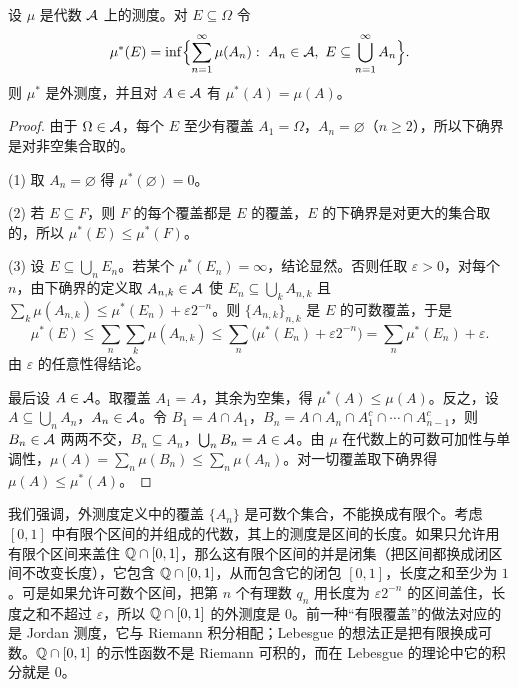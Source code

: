 \begin{proposition}[由代数上的测度诱导的外测度]\label{prop:extension:induced-outer}
设 $\mu$ 是代数 $\mathcal{A}$ 上的测度。对 $E\subseteq\Omega$ 令
\[
\mu^*(E)=\inf\Bigl\{\sum_{n=1}^\infty\mu(A_n):\ A_n\in\cA,\ E\subseteq\bigcup_{n=1}^\infty A_n\Bigr\}.
\]
则 $\mu^*$ 是外测度，并且对 $A\in\mathcal{A}$ 有 $\mu^*(A)=\mu(A)$。
\end{proposition}
\begin{proof}
由于 $\Omega\in\mathcal{A}$，每个 $E$ 至少有覆盖 $A_1=\Omega$，$A_n=\varnothing$（$n\geqslant2$），所以下确界是对非空集合取的。

(1) 取 $A_n=\varnothing$ 得 $\mu^*(\varnothing)=0$。

(2) 若 $E\subseteq F$，则 $F$ 的每个覆盖都是 $E$ 的覆盖，$E$ 的下确界是对更大的集合取的，所以 $\mu^*(E)\leqslant\mu^*(F)$。

(3) 设 $E\subseteq\bigcup_nE_n$。若某个 $\mu^*(E_n)=\infty$，结论显然。否则任取 $\varepsilon>0$，对每个 $n$，由下确界的定义取 $A_{n,k}\in\mathcal{A}$ 使 $E_n\subseteq\bigcup_kA_{n,k}$ 且 $\sum_k\mu(A_{n,k})\leqslant\mu^*(E_n)+\varepsilon2^{-n}$。则 $\{A_{n,k}\}_{n,k}$ 是 $E$ 的可数覆盖，于是
\[
\mu^*(E)\leqslant\sum_n\sum_k\mu(A_{n,k})\leqslant\sum_n\bigl(\mu^*(E_n)+\varepsilon2^{-n}\bigr)=\sum_n\mu^*(E_n)+\varepsilon.
\]
由 $\varepsilon$ 的任意性得结论。

最后设 $A\in\mathcal{A}$。取覆盖 $A_1=A$，其余为空集，得 $\mu^*(A)\leqslant\mu(A)$。反之，设 $A\subseteq\bigcup_nA_n$，$A_n\in\mathcal{A}$。令 $B_1=A\cap A_1$，$B_n=A\cap A_n\cap A_1^c\cap\cdots\cap A_{n-1}^c$，则 $B_n\in\mathcal{A}$ 两两不交，$B_n\subseteq A_n$，$\bigcup_nB_n=A\in\mathcal{A}$。由 $\mu$ 在代数上的可数可加性与单调性，$\mu(A)=\sum_n\mu(B_n)\leqslant\sum_n\mu(A_n)$。对一切覆盖取下确界得 $\mu(A)\leqslant\mu^*(A)$。
\end{proof}

\begin{example}[覆盖必须是可数的]
我们强调，外测度定义中的覆盖 $\{A_n\}$ 是可数个集合，不能换成有限个。考虑 $[0,1]$ 中有限个区间的并组成的代数，其上的测度是区间的长度。如果只允许用有限个区间来盖住 $\mathbb{Q}\cap[0,1]$，那么这有限个区间的并是闭集（把区间都换成闭区间不改变长度），它包含 $\mathbb{Q}\cap[0,1]$，从而包含它的闭包 $[0,1]$，长度之和至少为 $1$。可是如果允许可数个区间，把第 $n$ 个有理数 $q_n$ 用长度为 $\varepsilon2^{-n}$ 的区间盖住，长度之和不超过 $\varepsilon$，所以 $\mathbb{Q}\cap[0,1]$ 的外测度是 $0$。前一种“有限覆盖”的做法对应的是 Jordan 测度，它与 Riemann 积分相配；Lebesgue 的想法正是把有限换成可数。$\mathbb{Q}\cap[0,1]$ 的示性函数不是 Riemann 可积的，而在 Lebesgue 的理论中它的积分就是 $0$。
\end{example}

